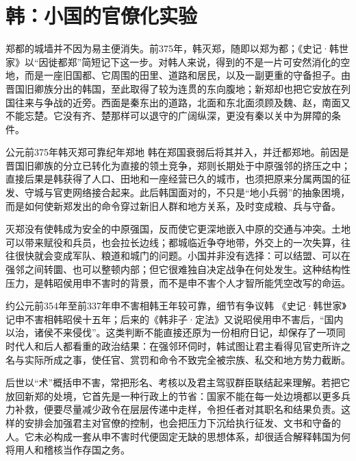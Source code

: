 \section{韩：小国的官僚化实验}

郑都的城墙并不因为易主便消失。前375年，韩灭郑，随即以郑为都；《史记·韩世家》以“因徙都郑”简短记下这一步。对韩人来说，得到的不是一片可安然消化的空地，而是一座旧国都、它周围的田里、道路和居民，以及一副更重的守备担子。由晋国旧卿族分出的韩国，至此取得了较为连贯的东向腹地；新郑却也把它安放在列国往来与争战的近旁。西面是秦东出的道路，北面和东北面须顾及魏、赵，南面又不能忘楚。它没有齐、楚那样可以退守的广阔纵深，更没有秦以关中为屏障的条件。

\begin{event}{公元前375年}{韩灭郑}{可靠纪年}{郑地}
韩在郑国衰弱后将其并入，并迁都郑地。前因是晋国旧卿族的分立已转化为直接的领土竞争，郑则长期处于中原强邻的挤压之中；直接后果是韩获得了人口、田地和一座经营已久的城市，也须把原来分属两国的征发、守城与官吏网络接合起来。此后韩国面对的，不只是“地小兵弱”的抽象困境，而是如何使新郑发出的命令穿过新旧人群和地方关系，及时变成粮、兵与守备。
\end{event}

灭郑没有使韩成为安全的中原强国，反而使它更深地嵌入中原的交通与冲突。土地可以带来赋役和兵员，也会拉长边线；都城临近争夺地带，外交上的一次失算，往往很快就会变成军队、粮道和城门的问题。小国并非没有选择：可以结盟、可以在强邻之间转圜、也可以整顿内部；但它很难独自决定战争在何处发生。这种结构性压力，是韩昭侯用申不害时的背景，而不是申不害个人才智所能凭空改写的命运。

\begin{event}{约公元前354年至前337年}{申不害相韩}{王年较可靠，细节有争议}{韩}
《史记·韩世家》记申不害相韩昭侯十五年；后来的《韩非子·定法》又说昭侯用申不害后，“国内以治，诸侯不来侵伐”。这类判断不能直接还原为一份相府日记，却保存了一项同时代人和后人都看重的政治结果：在强邻环伺时，韩试图让君主看得见官吏所许之名与实际所成之事，使任官、赏罚和命令不致完全被宗族、私交和地方势力截断。
\end{event}

后世以“术”概括申不害，常把形名、考核以及君主驾驭群臣联结起来理解。若把它放回新郑的处境，它首先是一种行政上的节省：国家不能在每一处边境都以更多兵力补救，便要尽量减少政令在层层传递中走样，令担任者对其职名和结果负责。这样的安排会加强君主对官僚的控制，也会把压力下沉给执行征发、文书和守备的人。它未必构成一套从申不害时代便固定无缺的思想体系，却很适合解释韩国为何将用人和稽核当作存国之务。

